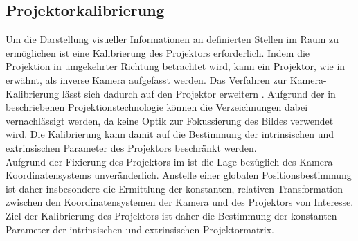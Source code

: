 



\subsection{Projektorkalibrierung}
\label{chap.projcalib}
Um die Darstellung visueller Informationen an definierten Stellen im Raum zu ermöglichen ist eine Kalibrierung des Projektors erforderlich. Indem die Projektion in umgekehrter Richtung betrachtet wird, kann ein Projektor, wie in  erwähnt, als inverse Kamera aufgefasst werden. Das Verfahren zur Kamera-Kalibrierung lässt sich dadurch auf den Projektor erweitern \cite{Falcao2008}. Aufgrund der in  beschriebenen Projektionstechnologie können die Verzeichnungen dabei vernachlässigt werden, da keine Optik zur Fokussierung des Bildes verwendet wird. Die Kalibrierung kann damit auf die Bestimmung der intrinsischen und extrinsischen Parameter des Projektors beschränkt werden.\\

Aufgrund der Fixierung des Projektors im \kps{} ist die Lage bezüglich des Kamera-Koordinatensystems unveränderlich. Anstelle einer globalen Positionsbestimmung ist daher insbesondere die Ermittlung der konstanten, relativen Transformation zwischen den Koordinatensystemen der Kamera und des Projektors von Interesse. Ziel der Kalibrierung des Projektors ist daher die Bestimmung der konstanten Parameter der intrinsischen und extrinsischen Projektormatrix.\\

